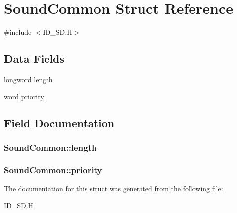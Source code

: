 \hypertarget{structSoundCommon}{
\section{SoundCommon Struct Reference}
\label{structSoundCommon}
}


{\ttfamily \#include $<$ID\_\-SD.H$>$}

\subsection*{Data Fields}
\begin{DoxyCompactItemize}
\item 
\hyperlink{ID__HEAD_8H_a8a9a7dd50c6fdb45dcdf0eb929479663}{longword} \hyperlink{structSoundCommon_a34153dc3370cab7fd2274cd8c89419a0}{length}
\item 
\hyperlink{ID__HEAD_8H_abad51e07ab6d26bec9f1f786c8d65bcd}{word} \hyperlink{structSoundCommon_a0e7ce306d48e0f91bbbab46cf59ed659}{priority}
\end{DoxyCompactItemize}


\subsection{Field Documentation}
\hypertarget{structSoundCommon_a34153dc3370cab7fd2274cd8c89419a0}{
\subsubsection[{length}]{ {\bf SoundCommon::length}}}
\label{structSoundCommon_a34153dc3370cab7fd2274cd8c89419a0}
\hypertarget{structSoundCommon_a0e7ce306d48e0f91bbbab46cf59ed659}{
\subsubsection[{priority}]{ {\bf SoundCommon::priority}}}
\label{structSoundCommon_a0e7ce306d48e0f91bbbab46cf59ed659}


The documentation for this struct was generated from the following file:\begin{DoxyCompactItemize}
\item 
\hyperlink{ID__SD_8H}{ID\_\-SD.H}\end{DoxyCompactItemize}
